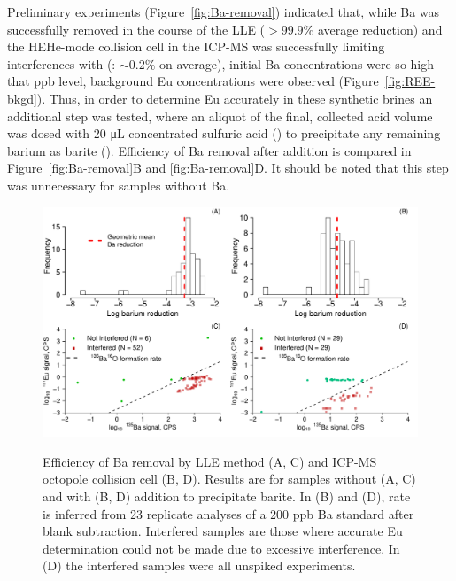 Preliminary experiments (Figure~\ref{fig:Ba-removal}) indicated that, while Ba was successfully removed in the course of the LLE ($>99.9\%$ average reduction) and the HEHe-mode collision cell in the ICP-MS was successfully limiting  interferences with  (: $\sim0.2\%$ on average), initial Ba concentrations were so high that ppb level, background Eu concentrations were observed (Figure~\ref{fig:REE-bkgd}).
Thus, in order to determine Eu accurately in these synthetic brines an additional step was tested, where an aliquot of the final, collected acid volume was dosed with 20 \si{\uL} concentrated sulfuric acid () to precipitate any remaining barium as barite ().
Efficiency of Ba removal after  addition is compared in Figure~\ref{fig:Ba-removal}B and \ref{fig:Ba-removal}D.
It should be noted that this step was unnecessary for samples without Ba.

\begin{figure}[htbp]
\begin{center}
\includegraphics[width=\textwidth]{Ch4_figures/Ba-removal.pdf}
\caption{Efficiency of Ba removal by LLE method (A, C) and ICP-MS octopole collision cell (B, D).
Results are for samples without (A, C) and with (B, D)  addition to precipitate barite.
In (B) and (D),  rate is inferred from 23 replicate analyses of a 200 ppb Ba standard after blank subtraction.
Interfered samples are those where accurate Eu determination could not be made due to excessive  interference. In (D) the interfered samples were all unspiked experiments.}\label{fig:Ba-removal}
\label{default}
\end{center}
\end{figure}

